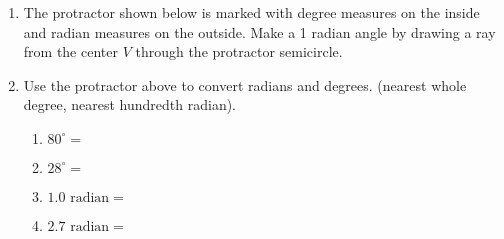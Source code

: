 \begin{enumerate}
\item The protractor shown below is marked with degree measures on the inside and radian measures on the outside. Make a 1 radian angle by drawing a ray from the center $V$ through the protractor semicircle. \par \medskip
  \begin{center}
  \end{center}

\item Use the protractor above to convert radians and degrees. (nearest whole degree, nearest hundredth radian).
  \begin{multicols}{2}
    \begin{enumerate}
      \item $80^\circ = $ \vspace{0.7cm}
      \item $28^\circ = $ \vspace{0.7cm}
      \item $\displaystyle 1.0 \text{ radian} =$ \vspace{0.7cm}
      \item $\displaystyle 2.7 \text{ radian} =$
    \end{enumerate}
  \end{multicols}
    
\end{enumerate}
